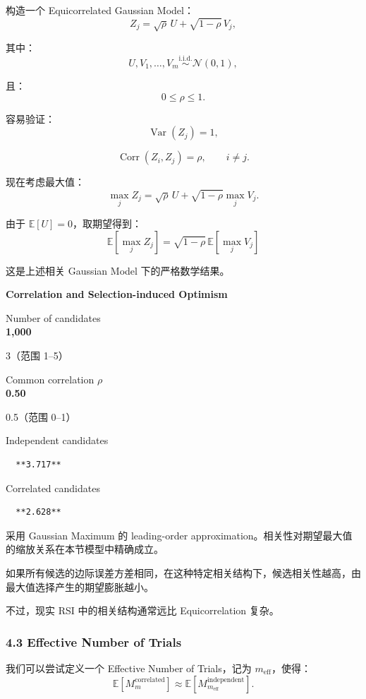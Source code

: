 构造一个 Equicorrelated Gaussian Model：
\[Z_j
=
\sqrt\rho\,U
+
\sqrt{1-\rho}\,V_j,\]

其中：
\[U,V_1,\ldots,V_m
\overset{\mathrm{i.i.d.}}{\sim}\mathcal N(0,1),\]

且：
\[0\leq\rho\leq1.\]

容易验证：
\[\operatorname{Var}(Z_j)=1,\]

\[\operatorname{Corr}(Z_i,Z_j)=\rho,
\qquad i\neq j.\]

现在考虑最大值：
\[\max_j Z_j
=
\sqrt\rho\,U
+
\sqrt{1-\rho}\max_j V_j.\]

由于 \(\mathbb E[U]=0\)，取期望得到：
\[\boxed{
\mathbb E[\max_j Z_j]
=
\sqrt{1-\rho}\,
\mathbb E[\max_j V_j]
}\]

这是上述相关 Gaussian Model 下的严格数学结果。

\textbf{Correlation and Selection-induced Optimism}

Number of candidates\\
\textbf{1,000}

3（范围 1--5）

Common correlation \(\rho\)\\
\textbf{0.50}

0.5（范围 0--1）

Independent candidates

\begin{verbatim}
  **3.717**
\end{verbatim}

Correlated candidates

\begin{verbatim}
  **2.628**
\end{verbatim}

采用 Gaussian Maximum 的 leading-order approximation。相关性对期望最大值的缩放关系在本节模型中精确成立。

如果所有候选的边际误差方差相同，在这种特定相关结构下，候选相关性越高，由最大值选择产生的期望膨胀越小。

不过，现实 RSI 中的相关结构通常远比 Equicorrelation 复杂。

\hypertarget{part-4-71-0001-effective-number-of-trials}{%
\subsubsection{4.3 Effective Number of Trials}\label{part-4-71-0001-effective-number-of-trials}}

我们可以尝试定义一个 Effective Number of Trials，记为 \(m_{\mathrm{eff}}\)，使得：
\[\mathbb E[M_m^{\mathrm{correlated}}]
\approx
\mathbb E[M_{m_{\mathrm{eff}}}^{\mathrm{independent}}].\]

